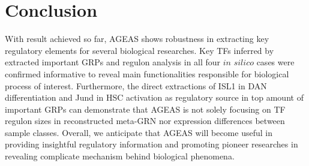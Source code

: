 \documentclass[fleqn,10pt]{wlscirep}
\begin{document}

\section*{Conclusion}
  With result achieved so far, AGEAS shows robustness in extracting key regulatory elements for several biological researches.
  Key TFs inferred by extracted important GRPs and regulon analysis in all four $in$ $silico$ cases were confirmed informative to reveal main functionalities responsible for biological process of interest.
  Furthermore, the direct extractions of ISL1 in DAN differentiation and Jund in HSC activation as regulatory source in top amount of important GRPs can demonstrate that AGEAS is not solely focusing on TF regulon sizes in reconstructed meta-GRN nor expression differences between sample classes.
  Overall, we anticipate that AGEAS will become useful in providing insightful regulatory information and promoting pioneer researches in revealing complicate mechanism behind biological phenomena.
\end{document}
